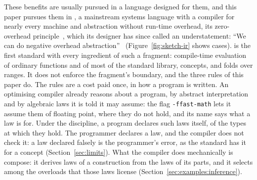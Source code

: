 These benefits are usually pursued in a language designed for them, and this paper pursues them in , a mainstream systems language with a compiler for nearly every machine and abstraction without run-time overhead, its zero-overhead principle~\cite{stroustrup2005abstraction}, which its designer has since called an understatement: ``We can do negative overhead abstraction''~\cite{stroustrup2026peterman} (Figure~\ref{fig:sketch-ir} shows cases).
 is the first standard with every ingredient of such a fragment: compile-time evaluation of ordinary functions and of most of the standard library, concepts, and folds over ranges.
It does not enforce the fragment's boundary, and the three rules of this paper do.
The rules are a cost paid once, in how a program is written.
An optimising compiler already reasons about a program, by abstract interpretation~\cite{cousot1977abstract} and by algebraic laws it is told it may assume: the flag \texttt{-ffast-math} lets it assume them of floating point, where they do not hold, and its name says what a law is for.
Under the discipline, a program declares such laws itself, of the types at which they hold.
The programmer declares a law, and the compiler does not check it: a law declared falsely is the programmer's error, as the standard has it for a concept (Section~\ref{sec:limits}).
What the compiler does mechanically is compose: it derives laws of a construction from the laws of its parts, and it selects among the overloads that those laws license (Section~\ref{sec:examples:inference}).

